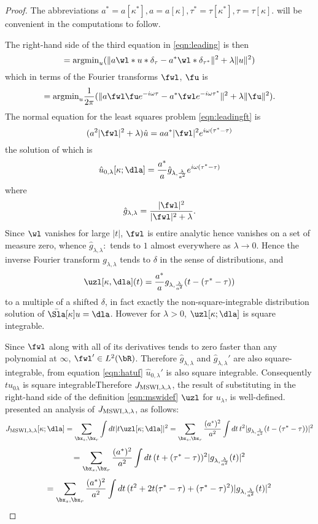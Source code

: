 \begin{proof}
The abbreviations
$a^*=a[\kappa^*], a=a[\kappa], \tau^*=\tau[\kappa^*], \tau=\tau[\kappa]$.
will be convenient in the computations to follow.

The right-hand side of the third equation in \ref{eqn:leading} is then
\[
= \mbox{argmin}_u (\|a \wl*u*\delta_{\tau}-a^*\wl*\delta_{\tau^*}\|^2 + \lambda\|u\|^2)
\]
which in terms of the Fourier transforms $\fwl$, $\fu$ is
\begin{equation}
  \label{eqn:leadingft}
= \mbox{argmin}_u \frac{1}{2\pi}(\|a \fwl \fu e^{-i\omega \tau}-a^*\fwl e^{-i\omega \tau^*}\|^2 + \lambda\|\fu\|^2).
\end{equation}
The normal equation for the least squares problem \ref{eqn:leadingft} is
\[
(a^2 |\fwl|^2 +\lambda)\hat{u} = a a^*|\fwl|^2e^{i\omega(\tau^*-\tau)}
\]
the solution of which is
\begin{equation}
  \label{eqn:hatuf}
\hat{u}_{0,\lambda}[\kappa;\dla] = \frac{a^*}{a}\hat{g}_{\lambda,\frac{\lambda}{a^2}} e^{i\omega(\tau^*-\tau)}
\end{equation}
where
\begin{equation}
  \label{eqn:hatgf}
\hat{g}_{\lambda,\lambda} = \frac{|\fwl|^2}{|\fwl|^2 + \lambda}.
\end{equation}
Since $\wl$ vanishes for large $|t|$, $\fwl$ is entire analytic hence
vanishes on a set of measure zero, whence $\hat{g}_{\lambda,\lambda}:$
tends to $1$ almost everywhere as $\lambda \rightarrow 0$. Hence the
inverse Fourier transform $g_{\lambda,\lambda}$ tends to $\delta$ in
the sense of distributions, and
\begin{equation}
  \label{eqn:u0s}
\uzl[\kappa,\dla](t) = \frac{a^*}{a}g_{\lambda,\frac{\lambda}{a^2}}(t-(\tau^*-\tau))
\end{equation}
to a multiple of a shifted $\delta$, in fact exactly the
non-square-integrable distribution
solution of $\bar{\Sla}[\kappa]u=\dla$. However for $\lambda>0$, $\uzl[\kappa;\dla]$ is square integrable.

Since $\fwl$ along with all of its derivatives
tends to zero faster than any polynomial at $\infty$, $\fwl' \in
L^2(\bR)$.
Therefore $\hat{g}_{\lambda,\lambda}$
and $\hat{g}_{\lambda,\lambda}'$ are also square-integrable, 
from equation \ref{eqn:hatuf} $\hat{u}_{0,\lambda}'$ is also square
integrable. Consequently $t u_{0\lambda}$ is square integrableTherefore
$J_{\rm MSWI,\lambda,\lambda}$, the result of substituting in the
right-hand side of the definition \ref{eqn:mswidef} $\uzl$ for
$u_{\lambda}$, is well-defined. \cite{HuangSymes2015SEG} presented an analysis of
$J_{\rm MSWI,\lambda,\lambda}$, as follows:
\[
J_{\rm MSWI,\lambda,\lambda}[\kappa;\dla] = \sum_{\bx_s,\bx_r}\int dt
|t\uzl[\kappa;\dla]|^2 =  \sum_{\bx_s,\bx_r}\frac{(a^*)^2}{a^2} \int dt\, t^2|g_{\lambda,\frac{\lambda}{a^2}}(t-(\tau^*-\tau))|^2
\]
\[
=\sum_{\bx_s,\bx_r}\frac{(a^*)^2}{a^2} \int dt\, (t+(\tau^*-\tau))^2|g_{\lambda,\frac{\lambda}{a^2}}(t)|^2
\]
\begin{equation}
  \label{eqn:MSWI}
  =\sum_{\bx_s,\bx_r}\frac{(a^*)^2}{a^2} \int dt\, (t^2 + 2t
  (\tau^*-\tau)+(\tau^*-\tau)^2)|g_{\lambda,\frac{\lambda}{a^2}}(t)|^2
\end{equation}


\end{proof}
